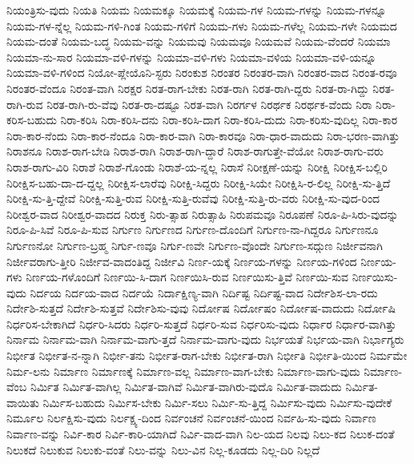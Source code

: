 {ನಿಯಂತ್ರಿಸು-ವುದು
ನಿಯತಿ
ನಿಯಮ
ನಿಯಮಕ್ಕೂ
ನಿಯಮಕ್ಕೆ
ನಿಯಮ-ಗಳ
ನಿಯಮ-ಗಳನ್ನು
ನಿಯಮ-ಗಳನ್ನೂ
ನಿಯಮ-ಗಳ-ನ್ನೆಲ್ಲ
ನಿಯಮ-ಗಳಿ-ಗಿಂತ
ನಿಯಮ-ಗಳಿಗೆ
ನಿಯಮ-ಗಳು
ನಿಯಮ-ಗಳೆಲ್ಲ
ನಿಯಮ-ಗಳೇ
ನಿಯಮದ
ನಿಯಮ-ದಂತೆ
ನಿಯಮ-ಬದ್ಧ
ನಿಯಮ-ವನ್ನು
ನಿಯಮವು
ನಿಯಮವೂ
ನಿಯಮವೆ
ನಿಯಮ-ವೆಂದರೆ
ನಿಯಮಾ
ನಿಯಮಾ-ನು-ಸಾರ
ನಿಯಮಾ-ವಳಿ-ಗಳನ್ನು
ನಿಯಮಾ-ವಳಿ-ಗಳು
ನಿಯಮಾ-ವಳಿಯ
ನಿಯಮಾ-ವಳಿ-ಯನ್ನೂ
ನಿಯಮಾ-ವಳಿ-ಗಳಿಂದ
ನಿಯೋ-ಪ್ಲೇಯೊನಿ-ಸ್ಟರು
ನಿರಂಕುಶ
ನಿರಂತರ
ನಿರಂತರ-ವಾಗಿ
ನಿರಂತರ-ವಾದ
ನಿರಂತ-ರವೂ
ನಿರಂತರ-ವೆಂದೂ
ನಿರಂತ-ವಾಗಿ
ನಿರಕ್ಷರ
ನಿರತ-ರಾಗ-ಬೇಕು
ನಿರತ-ರಾಗಿ
ನಿರತ-ರಾಗಿ-ದ್ದರು
ನಿರತ-ರಾ-ಗಿದ್ದು
ನಿರತ-ರಾಗಿ-ರುವ
ನಿರತ-ರಾಗಿ-ರು-ವೆವು
ನಿರತ-ರಾ-ದಷ್ಟೂ
ನಿರತ-ವಾಗಿ
ನಿರರ್ಗಳ
ನಿರರ್ಥಕ
ನಿರರ್ಥಕ-ವೆಂದು
ನಿರಾ
ನಿರಾ-ಕರಿಸ-ಬಹುದು
ನಿರಾ-ಕರಿಸಿ
ನಿರಾ-ಕರಿಸಿ-ದನು
ನಿರಾ-ಕರಿಸಿ-ದಾಗ
ನಿರಾ-ಕರಿಸಿ-ದುದು
ನಿರಾ-ಕರಿಸು-ವುದಿಲ್ಲ
ನಿರಾ-ಕಾರ
ನಿರಾ-ಕಾರ-ನೆಂದು
ನಿರಾ-ಕಾರ-ನೆಂದೂ
ನಿರಾ-ಕಾರ-ವಾಗಿ
ನಿರಾ-ಕಾರವೂ
ನಿರಾ-ಧಾರ-ವಾದುದು
ನಿರಾ-ಭರಣ-ವಾಗಿತ್ತು
ನಿರಾಶನೂ
ನಿರಾಶ-ರಾಗ-ಬೇಡಿ
ನಿರಾಶ-ರಾಗಿ
ನಿರಾಶ-ರಾಗಿ-ದ್ದಾರೆ
ನಿರಾಶ-ರಾಗುತ್ತೇ-ವೆಯೋ
ನಿರಾಶ-ರಾಗು-ವರು
ನಿರಾಶ-ರಾಗು-ವಿರಿ
ನಿರಾಶೆ
ನಿರಾಶೆ-ಗೊಂಡು
ನಿರಾಶೆ-ಯ-ನ್ನಲ್ಲ
ನಿರಾಸೆ
ನಿರೀಕ್ಷಣೆ-ಯನ್ನು
ನಿರೀಕ್ಷಿ
ನಿರೀಕ್ಷಿಸ-ಬಲ್ಲಿರಿ
ನಿರೀಕ್ಷಿಸ-ಬಹು-ದಾ-ದ-ದ್ದಲ್ಲ
ನಿರೀಕ್ಷಿಸ-ಲಾರೆವು
ನಿರೀಕ್ಷಿ-ಸಿದ್ದರು
ನಿರೀಕ್ಷಿ-ಸಿಯೇ
ನಿರೀಕ್ಷಿಸಿ-ರ-ಲಿಲ್ಲ
ನಿರೀಕ್ಷಿ-ಸು-ತ್ತಿದೆ
ನಿರೀಕ್ಷಿ-ಸು-ತ್ತಿ-ದ್ದೇವೆ
ನಿರೀಕ್ಷಿ-ಸುತ್ತಿ-ರುವ
ನಿರೀಕ್ಷಿ-ಸುತ್ತಿ-ರುವೆವು
ನಿರೀಕ್ಷಿ-ಸುತ್ತಿ-ರು-ವರು
ನಿರೀಕ್ಷಿ-ಸು-ವುದ-ರಿಂದ
ನಿರೀಶ್ವರ-ವಾದ
ನಿರೀಶ್ವರ-ವಾದದ
ನಿರುಕ್ತ
ನಿರು-ತ್ಸಾಹ
ನಿರುತ್ಸಾಹಿ
ನಿರುಪಮವೂ
ನಿರೂಪಣೆ
ನಿರೂ-ಪಿ-ಸಿರು-ವುದನ್ನು
ನಿರೂ-ಪಿ-ಸಿವೆ
ನಿರೂ-ಪಿ-ಸುವ
ನಿರ್ಗುಣ
ನಿರ್ಗುಣದ
ನಿರ್ಗುಣ-ದೊಂದಿಗೆ
ನಿರ್ಗುಣ-ನಾ-ಗಿದ್ದರೂ
ನಿರ್ಗುಣನೂ
ನಿರ್ಗುಣನೋ
ನಿರ್ಗುಣ-ಬ್ರಹ್ಮ
ನಿರ್ಗು-ಣವೂ
ನಿರ್ಗು-ಣವೇ
ನಿರ್ಗುಣ-ವೊಂದೇ
ನಿರ್ಗುಣ-ಸದ್ಗುಣ
ನಿರ್ಜೀವನಾಗಿ
ನಿರ್ಜೀವರಾಗು-ತ್ತೀರಿ
ನಿರ್ಜೀವ-ವಾದಂತಿದ್ದ
ನಿರ್ಜೀವಿ
ನಿರ್ಣ-ಯಕ್ಕೆ
ನಿರ್ಣಯ-ಗಳನ್ನು
ನಿರ್ಣಯ-ಗಳಿಂದ
ನಿರ್ಣಯ-ಗಳು
ನಿರ್ಣಯ-ಗಳೊಂದಿಗೆ
ನಿರ್ಣಯಿ-ಸಿ-ದಾಗ
ನಿರ್ಣಯಿಸಿ-ರುವ
ನಿರ್ಣಯಿಸು-ತ್ತಿವೆ
ನಿರ್ಣಯಿ-ಸುವ
ನಿರ್ಣಯಿಸು-ವುದು
ನಿರ್ದಯ
ನಿರ್ದಯ-ವಾದ
ನಿರ್ದಯೆ
ನಿರ್ದಾಕ್ಷಿಣ್ಯ-ವಾಗಿ
ನಿರ್ದಿಷ್ಟ
ನಿರ್ದಿಷ್ಟ-ವಾದ
ನಿರ್ದೇಶಿಸ-ಲಾ-ರದು
ನಿರ್ದೇಶಿ-ಸುತ್ತದೆ
ನಿರ್ದೇಶಿ-ಸುತ್ತವೆ
ನಿರ್ದೇಶಿಸು-ವುವು
ನಿರ್ದೋಷ
ನಿರ್ದೋಷಂ
ನಿರ್ದೋಷ-ವಾದುದು
ನಿರ್ದೋಷಿ
ನಿರ್ಧರಿಸ-ಬೇಕಾಗಿದೆ
ನಿರ್ಧರಿ-ಸಿದರು
ನಿರ್ಧರಿ-ಸುತ್ತದೆ
ನಿರ್ಧರಿ-ಸುವ
ನಿರ್ಧರಿಸು-ವುದು
ನಿರ್ಧಾರ
ನಿರ್ಧಾರ-ವಾಗಿತ್ತು
ನಿರ್ನಾಮ
ನಿರ್ನಾಮ-ವಾಗಿ
ನಿರ್ನಾಮ-ವಾಗು-ತ್ತದೆ
ನಿರ್ನಾಮ-ವಾಗು-ವುದು
ನಿರ್ಭಯತೆ
ನಿರ್ಭಯ-ವಾಗಿ
ನಿರ್ಭಾಗ್ಯರು
ನಿರ್ಭೀತ
ನಿರ್ಭೀತ-ನ-ನ್ನಾಗಿ
ನಿರ್ಭೀ-ತನು
ನಿರ್ಭೀತ-ರಾಗ-ಬೇಕು
ನಿರ್ಭೀತ-ರಾಗಿ
ನಿರ್ಭೀತಿ
ನಿರ್ಭೀತಿ-ಯಿಂದ
ನಿರ್ಮಮೇ
ನಿರ್ಮ-ಲನು
ನಿರ್ಮಾಣ
ನಿರ್ಮಾಣಕ್ಕೆ
ನಿರ್ಮಾಣ-ವಲ್ಲ
ನಿರ್ಮಾಣ-ವಾಗ-ಬೇಕು
ನಿರ್ಮಾಣ-ವಾಗು-ವುದು
ನಿರ್ಮಾಣ-ವೆಂಬ
ನಿರ್ಮಿತ
ನಿರ್ಮಿತ-ವಾಗಿಲ್ಲ
ನಿರ್ಮಿತ-ವಾಗಿವೆ
ನಿರ್ಮಿತ-ವಾಗಿರು-ವುದೊ
ನಿರ್ಮಿತ-ವಾದುದು
ನಿರ್ಮಿತ-ವಾಯಿತು
ನಿರ್ಮಿಸ-ಬಹುದು
ನಿರ್ಮಿಸ-ಬೇಕು
ನಿರ್ಮಿ-ಸಲು
ನಿರ್ಮಿ-ಸು-ತ್ತಿದ್ದ
ನಿರ್ಮಿಸು-ವುದು
ನಿರ್ಮಿಸು-ವುದೇಕೆ
ನಿರ್ಮೂಲ
ನಿರ್ಲಕ್ಷಿಸು-ವುದು
ನಿರ್ಲಕ್ಷ್ಯ-ದಿಂದ
ನಿರ್ವಂಚನೆ
ನಿರ್ವಂಚನೆ-ಯಿಂದ
ನಿರ್ವಹಿ-ಸು-ವುದು
ನಿರ್ವಾಣ
ನಿರ್ವಾಣ-ವನ್ನು
ನಿರ್ವಿ-ಕಾರ
ನಿರ್ವಿ-ಕಾರಿ-ಯಾಗಿದೆ
ನಿರ್ವಿ-ವಾದ-ವಾಗಿ
ನಿಲ-ಯದ
ನಿಲವು
ನಿಲು-ಕದ
ನಿಲುಕ-ದಂತೆ
ನಿಲುಕದೆ
ನಿಲುಕುವ
ನಿಲುಕು-ವಂತೆ
ನಿಲು-ವನ್ನು
ನಿಲು-ವಿನ
ನಿಲ್ಲ-ಕೂಡದು
ನಿಲ್ಲ-ದಿರಿ
ನಿಲ್ಲದೆ
}
